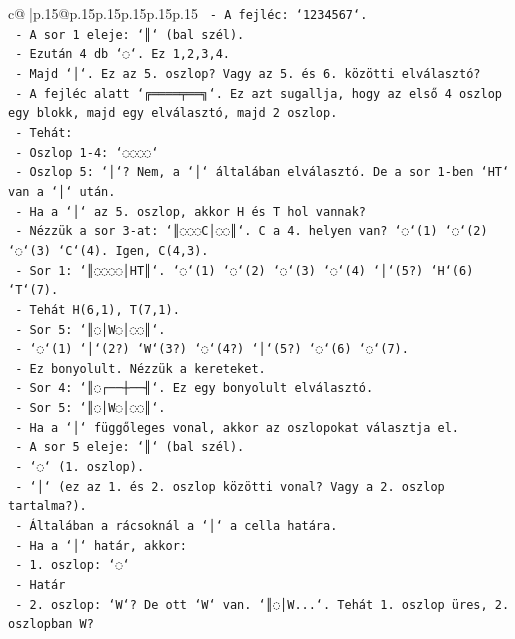 \documentclass{article}
\begin{document}
{\begin{supertabular}{c@{$\;$}|p{.15\linewidth}@{}p{.15\linewidth}p{.15\linewidth}p{.15\linewidth}p{.15\linewidth}p{.15\linewidth}}
{{{\texttt{    {-} A fejléc: `1234567`.} \\
\texttt{    {-} A sor 1 eleje: `║` (bal szél).} \\
\texttt{    {-} Ezután 4 db `◌`. Ez 1,2,3,4.} \\
\texttt{    {-} Majd `│`. Ez az 5. oszlop? Vagy az 5. és 6. közötti elválasztó?} \\
\texttt{    {-} A fejléc alatt `╔════╤══╗`. Ez azt sugallja, hogy az első 4 oszlop egy blokk, majd egy elválasztó, majd 2 oszlop.} \\
\texttt{    {-} Tehát:} \\
\texttt{      {-} Oszlop 1{-}4: `◌◌◌◌`} \\
\texttt{      {-} Oszlop 5: `│`? Nem, a `│` általában elválasztó. De a sor 1{-}ben `HT` van a `│` után.} \\
\texttt{      {-} Ha a `│` az 5. oszlop, akkor H és T hol vannak?} \\
\texttt{      {-} Nézzük a sor 3{-}at: `║◌◌◌C│◌◌║`. C a 4. helyen van? `◌`(1) `◌`(2) `◌`(3) `C`(4). Igen, C(4,3).} \\
\texttt{      {-} Sor 1: `║◌◌◌◌│HT║`. `◌`(1) `◌`(2) `◌`(3) `◌`(4) `│`(5?) `H`(6) `T`(7).} \\
\texttt{      {-} Tehát H(6,1), T(7,1).} \\
\texttt{    {-} Sor 5: `║◌│W◌│◌◌║`.} \\
\texttt{      {-} `◌`(1) `│`(2?) `W`(3?) `◌`(4?) `│`(5?) `◌`(6) `◌`(7).} \\
\texttt{      {-} Ez bonyolult. Nézzük a kereteket.} \\
\texttt{      {-} Sor 4: `║◌┌──┼──╢`. Ez egy bonyolult elválasztó.} \\
\texttt{      {-} Sor 5: `║◌│W◌│◌◌║`.} \\
\texttt{      {-} Ha a `│` függőleges vonal, akkor az oszlopokat választja el.} \\
\texttt{      {-} A sor 5 eleje: `║` (bal szél).} \\
\texttt{      {-} `◌` (1. oszlop).} \\
\texttt{      {-} `│` (ez az 1. és 2. oszlop közötti vonal? Vagy a 2. oszlop tartalma?).} \\
\texttt{      {-} Általában a rácsoknál a `│` a cella határa.} \\
\texttt{      {-} Ha a `│` határ, akkor:} \\
\texttt{        {-} 1. oszlop: `◌`} \\
\texttt{        {-} Határ} \\
\texttt{        {-} 2. oszlop: `W`? De ott `W` van. `║◌│W...`. Tehát 1. oszlop üres, 2. oszlopban W?} \\
}}}
\end{supertabular}}
\end{document}

